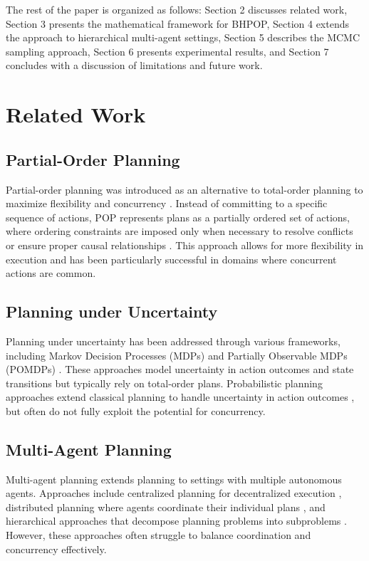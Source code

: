 \documentclass[twocolumn, 10pt]{article}
\begin{document}
The rest of the paper is organized as follows: Section 2 discusses related work, Section 3 presents the mathematical framework for BHPOP, Section 4 extends the approach to hierarchical multi-agent settings, Section 5 describes the MCMC sampling approach, Section 6 presents experimental results, and Section 7 concludes with a discussion of limitations and future work.

\section{Related Work}

\subsection{Partial-Order Planning}
Partial-order planning was introduced as an alternative to total-order planning to maximize flexibility and concurrency \citep{sacerdoti1975nonlinear}. Instead of committing to a specific sequence of actions, POP represents plans as a partially ordered set of actions, where ordering constraints are imposed only when necessary to resolve conflicts or ensure proper causal relationships \citep{weld1994introduction}. This approach allows for more flexibility in execution and has been particularly successful in domains where concurrent actions are common.

\subsection{Planning under Uncertainty}
Planning under uncertainty has been addressed through various frameworks, including Markov Decision Processes (MDPs) \citep{puterman2014markov} and Partially Observable MDPs (POMDPs) \citep{kaelbling1998planning}. These approaches model uncertainty in action outcomes and state transitions but typically rely on total-order plans. Probabilistic planning approaches extend classical planning to handle uncertainty in action outcomes \citep{kushmerick1995algorithm}, but often do not fully exploit the potential for concurrency.

\subsection{Multi-Agent Planning}
Multi-agent planning extends planning to settings with multiple autonomous agents. Approaches include centralized planning for decentralized execution \citep{boutilier1999sequential}, distributed planning where agents coordinate their individual plans \citep{durfee1999distributed}, and hierarchical approaches that decompose planning problems into subproblems \citep{tambe1997towards}. However, these approaches often struggle to balance coordination and concurrency effectively.
\end{document}
